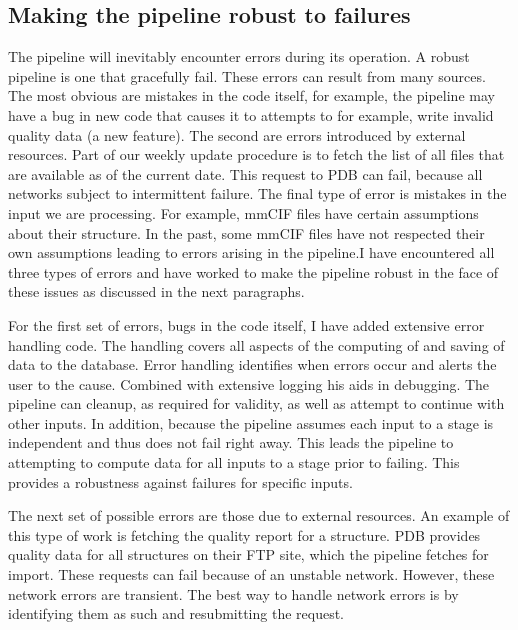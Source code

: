\subsection{Making the pipeline robust to failures}

The pipeline will inevitably encounter errors during its operation. A robust
pipeline is one that gracefully fail. These errors can result from many sources.
The most obvious are mistakes in the code itself, for example, the pipeline may
have a bug in new code that causes it to attempts to for example, write invalid
quality data (a new feature). The second are errors introduced by external
resources. Part of our weekly update procedure is to fetch the list of all files
that are available as of the current date. This request to PDB can fail, because
all networks subject to intermittent failure. The final type of error is
mistakes in the input we are processing. For example, mmCIF files have certain
assumptions about their structure. In the past, some mmCIF files have not
respected their own assumptions leading to errors arising in the pipeline.I have
encountered all three types of errors and have worked to make the pipeline
robust in the face of these issues as discussed in the next paragraphs.

For the first set of errors, bugs in the code itself, I have added extensive
error handling code. The handling covers all aspects of the computing of and
saving of data to the database. Error handling identifies when errors occur and
alerts the user to the cause. Combined with extensive logging his aids in
debugging. The pipeline can cleanup, as required for validity, as well as
attempt to continue with other inputs. In addition, because the pipeline assumes
each input to a stage is independent and thus does not fail right away. This
leads the pipeline to attempting to compute data for all inputs to a stage prior
to failing. This provides a robustness against failures for specific inputs.

The next set of possible errors are those due to external resources. An example
of this type of work is fetching the quality report for a structure. PDB
provides quality data for all structures on their FTP site, which the pipeline
fetches for import. These requests can fail because of an unstable network.
However, these network errors are transient. The best way to handle network
errors is by identifying them as such and resubmitting the request.

